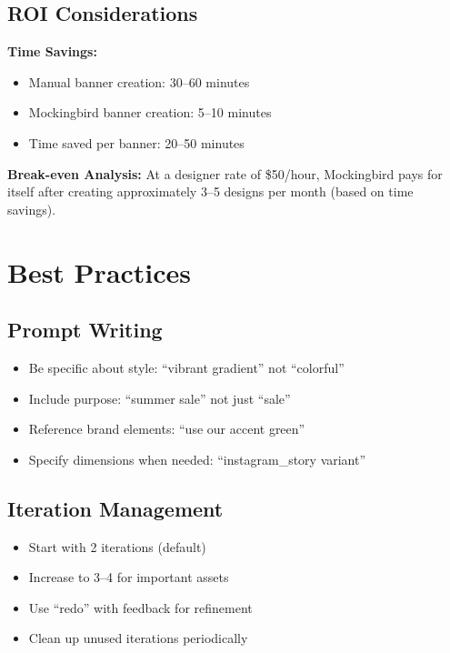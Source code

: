 \documentclass[11pt,a4paper]{article}
\begin{document}
\subsection{ROI Considerations}

\textbf{Time Savings:}
\begin{itemize}
    \item Manual banner creation: 30--60 minutes
    \item Mockingbird banner creation: 5--10 minutes
    \item Time saved per banner: 20--50 minutes
\end{itemize}

\textbf{Break-even Analysis:}
At a designer rate of \$50/hour, Mockingbird pays for itself after creating approximately 3--5 designs per month (based on time savings).

\section{Best Practices}

\subsection{Prompt Writing}
\begin{itemize}
    \item Be specific about style: ``vibrant gradient'' not ``colorful''
    \item Include purpose: ``summer sale'' not just ``sale''
    \item Reference brand elements: ``use our accent green''
    \item Specify dimensions when needed: ``instagram\_story variant''
\end{itemize}

\subsection{Iteration Management}
\begin{itemize}
    \item Start with 2 iterations (default)
    \item Increase to 3--4 for important assets
    \item Use ``redo'' with feedback for refinement
    \item Clean up unused iterations periodically
\end{itemize}
\end{document}
